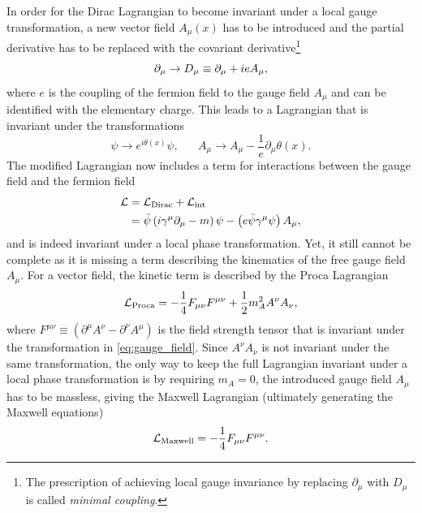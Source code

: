 In order for the Dirac Lagrangian to become invariant under a local gauge transformation, a new vector field $A_\mu(x)$ has to be introduced and the partial derivative has to be replaced with the covariant derivative\footnote{The prescription of achieving local gauge invariance by replacing $\partial_\mu$ with $D_\mu$ is called \textit{minimal coupling}.}
\begin{equation}
	\partial_\mu \rightarrow \mathop{}\!D_\mu \equiv \partial_\mu + ieA_\mu,
\end{equation}
where $e$ is the coupling of the fermion field to the gauge field $A_\mu$ and can be identified with the elementary charge. This leads to a Lagrangian that is invariant under the transformations
\begin{equation}
	\psi \rightarrow e^{i\theta\left(x\right)}\psi,\, \, \, \, \, \, \, \, \, \, A_\mu \rightarrow A_\mu - \frac{1}{e}\partial_\mu\theta(x).
	\label{eq:gauge_field}
\end{equation}
The modified Lagrangian now includes a term for interactions between the gauge field and the fermion field
\begin{equation}
\begin{split}
	\mathcal{L} &= \mathcal{L}_\mathrm{Dirac} + \mathcal{L}_\mathrm{int} \\
		&= \bar{\psi}\left(i\gamma^\mu\partial_\mu - m\right)\psi - \left(e\bar{\psi}\gamma^\mu\psi\right)A_\mu,
	\label{eq:modified_lagrangian}
\end{split}
\end{equation}
and is indeed invariant under a local phase transformation. Yet, it still cannot be complete as it is missing a term describing the kinematics of the free gauge field $A_\mu$. For a vector field, the kinetic term is described by the Proca Lagrangian
\begin{equation}
	\mathcal{L}_\mathrm{Proca} = -\frac{1}{4}F_{\mu\nu}F^{\mu\nu} + \frac{1}{2}m_A^2A^\nu A_\nu,
\end{equation}
where $F^{\mu\nu}\equiv\left(\partial^\mu A^\nu-\partial^\nu A^\mu\right)$ is the field strength tensor that is invariant under the transformation in \cref{eq:gauge_field}. Since $A^\nu A_\nu$ is not invariant under the same transformation, the only way to keep the full Lagrangian invariant under a local phase transformation is by requiring $m_A=0$, \ie the introduced gauge field $A_\mu$ has to be massless, giving the Maxwell Lagrangian (ultimately generating the Maxwell equations)
\begin{equation}
	\mathcal{L}_\mathrm{Maxwell} = -\frac{1}{4}F_{\mu\nu}F^{\mu\nu}.
\end{equation}

